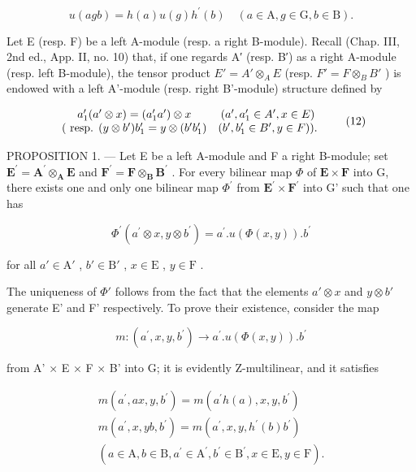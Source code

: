 \[
u (a g b) = h (a) u (g) h ^ {\prime} (b) \quad (a \in \mathrm{A}, g \in \mathrm{G}, b \in \mathrm{B}).\tag{11}
\]

Let E (resp. F) be a left A-module (resp. a right B-module). Recall (Chap. III, 2nd ed., App. II, no. 10) that, if one regards A′ (resp. B′) as a right A-module (resp. left B-module), the tensor product \(E' = A' \otimes_{A} E\) (resp. \(F' = F \otimes_{B} B'\) ) is endowed with a left A'-module (resp. right B'-module) structure defined by

\[
\begin{array}{c c} a _ {1} ^ {\prime} (a ^ {\prime} \otimes x) = (a _ {1} ^ {\prime} a ^ {\prime}) \otimes x & (a ^ {\prime}, a _ {1} ^ {\prime} \in A ^ {\prime}, x \in E) \\ (\text { resp. } (y \otimes b ^ {\prime}) b _ {1} ^ {\prime} = y \otimes (b ^ {\prime} b _ {1} ^ {\prime}) & (b ^ {\prime}, b _ {1} ^ {\prime} \in B ^ {\prime}, y \in F)). \end{array}\tag{12}
\]

PROPOSITION 1. --- Let E be a left A-module and F a right B-module; set \(\mathbf{E}^{\prime} = \mathbf{A}^{\prime}\otimes_{\mathbf{A}}\mathbf{E}\) and \(\mathbf{F}^{\prime} = \mathbf{F}\otimes_{\mathbf{B}}\mathbf{B}^{\prime}\) . For every bilinear map \(\Phi\) of \(\mathbf{E}\times \mathbf{F}\) into G, there exists one and only one bilinear map \(\Phi^{\prime}\) from \(\mathbf{E}^{\prime}\times \mathbf{F}^{\prime}\) into G' such that one has

\[
\Phi^ {\prime} (a ^ {\prime} \otimes x, y \otimes b ^ {\prime}) = a ^ {\prime}. u (\Phi (x, y)). b ^ {\prime}\tag{13}
\]

for all \(a' \in \mathrm{A}'\) , \(b' \in \mathrm{B}'\) , \(x \in \mathrm{E}\) , \(y \in \mathrm{F}\) .

The uniqueness of \(\Phi'\) follows from the fact that the elements \(a' \otimes x\) and \(y \otimes b'\) generate E' and F' respectively. To prove their existence, consider the map

\[
m: (a ^ {\prime}, x, y, b ^ {\prime}) \rightarrow a ^ {\prime}. u (\Phi (x, y)). b ^ {\prime}
\]

from A' × E × F × B' into G; it is evidently Z-multilinear, and it satisfies

\[
\begin{array}{r} m (a ^ {\prime}, a x, y, b ^ {\prime}) = m (a ^ {\prime} h (a), x, y, b ^ {\prime}) \\ m (a ^ {\prime}, x, y b, b ^ {\prime}) = m (a ^ {\prime}, x, y, h ^ {\prime} (b) b ^ {\prime}) \\ (a \in \mathrm{A}, b \in \mathrm{B}, a ^ {\prime} \in \mathrm{A} ^ {\prime}, b ^ {\prime} \in \mathrm{B} ^ {\prime}, x \in \mathrm{E}, y \in \mathrm{F}). \end{array}
\]

